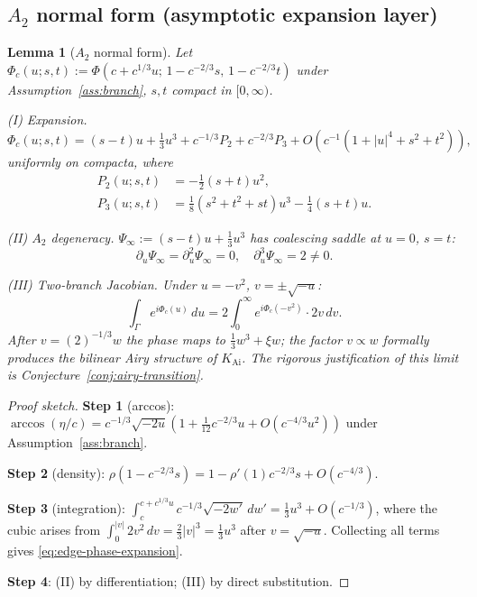 \documentclass[12pt,a4paper]{amsart}
\newtheorem{lemma}[theorem]{Lemma}
\theoremstyle{definition}
\theoremstyle{remark}
\begin{document}
\subsection{$A_2$ normal form (asymptotic expansion layer)}

\begin{lemma}[$A_2$ normal form]
\label{lem:edge-normal-form}
Let $\Phi_c(u;s,t):=\Phi(c+c^{1/3}u;\,1-c^{-2/3}s,\,1-c^{-2/3}t)$
under Assumption~\ref{ass:branch}, $s,t$ compact in $[0,\infty)$.

\medskip
\textup{(I) Expansion.}
\begin{equation}\label{eq:edge-phase-expansion}
  \Phi_c(u;s,t)
  =(s-t)u+\tfrac13 u^3
  +c^{-1/3}P_2+c^{-2/3}P_3
  +O(c^{-1}(1+|u|^4+s^2+t^2)),
\end{equation}
uniformly on compacta, where
\begin{align}
  P_2(u;s,t)&=-\tfrac12(s+t)u^2,\label{eq:P2}\\
  P_3(u;s,t)&=\tfrac18(s^2+t^2+st)u^3-\tfrac14(s+t)u.\label{eq:P3}
\end{align}

\medskip
\textup{(II) $A_2$ degeneracy.}
$\Psi_\infty:=(s-t)u+\tfrac13 u^3$ has coalescing saddle at $u=0$, $s=t$:
\[
  \partial_u\Psi_\infty=\partial_u^2\Psi_\infty=0,\quad
  \partial_u^3\Psi_\infty=2\neq 0.
\]

\medskip
\textup{(III) Two-branch Jacobian.}
Under $u=-v^2$, $v=\pm\sqrt{-u}$:
\begin{equation}\label{eq:two-branch}
  \int_\Gamma e^{i\Phi_c(u)}\,du
  =2\int_0^\infty e^{i\Phi_c(-v^2)}\cdot 2v\,dv.
\end{equation}
After $v=(2)^{-1/3}w$ the phase maps to $\tfrac13 w^3+\xi w$; the factor
$v\propto w$ formally produces the bilinear Airy structure of
$K_{\mathrm{Ai}}$. The rigorous justification of this limit is
Conjecture~\ref{conj:airy-transition}.
\end{lemma}

\begin{proof}[Proof sketch]
\textbf{Step 1} (arccos):
$\arccos(\eta/c)=c^{-1/3}\sqrt{-2u}(1+\frac{1}{12}c^{-2/3}u
+O(c^{-4/3}u^2))$ under Assumption~\ref{ass:branch}.

\textbf{Step 2} (density):
$\rho(1-c^{-2/3}s)=1-\rho'(1)c^{-2/3}s+O(c^{-4/3})$.

\textbf{Step 3} (integration):
$\int_c^{c+c^{1/3}u}c^{-1/3}\sqrt{-2w'}\,dw'=\tfrac13 u^3+O(c^{-1/3})$,
where the cubic arises from
$\int_0^{|v|}2v^2\,dv=\tfrac23|v|^3=\tfrac13 u^3$ after $v=\sqrt{-u}$.
Collecting all terms gives \eqref{eq:edge-phase-expansion}.

\textbf{Step 4}: (II) by differentiation; (III) by direct substitution.
\end{proof}
\end{document}
